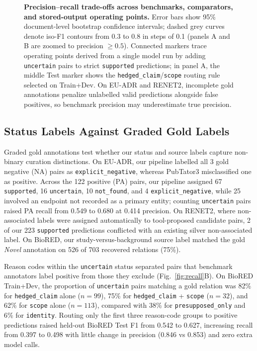 \documentclass[preprint,10pt,letterpaper]{elsarticle}
\newcommand{\st}[1]{\texttt{#1}}             %
\begin{document}
\begin{figure}[!htbp]
\centering
\resizebox{\linewidth}{!}{}
\caption{\textbf{Precision--recall trade-offs across benchmarks, comparators, and stored-output operating points.} Error bars show 95\% document-level bootstrap confidence intervals; dashed grey curves denote iso-F1 contours from 0.3 to 0.8 in steps of 0.1 (panels A and B are zoomed to precision $\geq 0.5$). Connected markers trace operating points derived from a single model run by adding \st{uncertain} pairs to strict \st{supported} predictions; in panel A, the middle Test marker shows the \st{hedged\_claim}/\st{scope} routing rule selected on Train+Dev. On EU-ADR and RENET2, incomplete gold annotations penalize unlabelled valid predictions alongside false positives, so benchmark precision may underestimate true precision.}
\label{fig:pr}
\end{figure}

\subsection{Status Labels Against Graded Gold Labels}
Graded gold annotations test whether our status and source labels capture non-binary curation distinctions. On EU-ADR, our pipeline labelled all 3 gold negative (NA) pairs as \st{explicit\_negative}, whereas PubTator3 misclassified one as positive. Across the 122 positive (PA) pairs, our pipeline assigned 67 \st{supported}, 16 \st{uncertain}, 10 \st{not\_found}, and 4 \st{explicit\_negative}, while 25 involved an endpoint not recorded as a primary entity; counting \st{uncertain} pairs raised PA recall from 0.549 to 0.680 at 0.414 precision. On RENET2, where non-associated labels were assigned automatically to tool-proposed candidate pairs, 2 of our 223 \st{supported} predictions conflicted with an existing silver non-associated label. On BioRED, our study-versus-background source label matched the gold \emph{Novel} annotation on 526 of 703 recovered relations (75\%).

Reason codes within the \st{uncertain} status separated pairs that benchmark annotators label positive from those they exclude (Fig.~\ref{fig:recall}B). On BioRED Train+Dev, the proportion of \st{uncertain} pairs matching a gold relation was 82\% for \st{hedged\_claim} alone ($n=99$), 75\% for \st{hedged\_claim} + \st{scope} ($n=32$), and 62\% for \st{scope} alone ($n=113$), compared with 38\% for \st{presupposed\_only} and 6\% for \st{identity}. Routing only the first three reason-code groups to positive predictions raised held-out BioRED Test F1 from 0.542 to 0.627, increasing recall from 0.397 to 0.498 with little change in precision (0.846 vs 0.853) and zero extra model calls.
\end{document}
